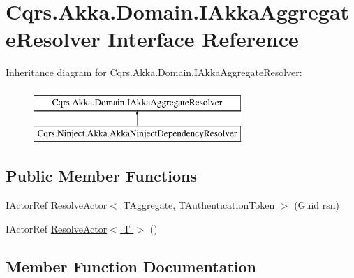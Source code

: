\hypertarget{interfaceCqrs_1_1Akka_1_1Domain_1_1IAkkaAggregateResolver}{}\section{Cqrs.\+Akka.\+Domain.\+I\+Akka\+Aggregate\+Resolver Interface Reference}
\label{interfaceCqrs_1_1Akka_1_1Domain_1_1IAkkaAggregateResolver}
Inheritance diagram for Cqrs.\+Akka.\+Domain.\+I\+Akka\+Aggregate\+Resolver\+:\begin{figure}[H]
\begin{center}
\leavevmode
\includegraphics[height=2.000000cm]{interfaceCqrs_1_1Akka_1_1Domain_1_1IAkkaAggregateResolver}
\end{center}
\end{figure}
\subsection*{Public Member Functions}
\begin{DoxyCompactItemize}
\item 
I\+Actor\+Ref \hyperlink{interfaceCqrs_1_1Akka_1_1Domain_1_1IAkkaAggregateResolver_a59dbc788ce9893d72684ff5c18945c1d}{Resolve\+Actor$<$ T\+Aggregate, T\+Authentication\+Token $>$} (Guid rsn)
\item 
I\+Actor\+Ref \hyperlink{interfaceCqrs_1_1Akka_1_1Domain_1_1IAkkaAggregateResolver_a9c3e3f9e8a963ea0b11e79f9eb1c55a9}{Resolve\+Actor$<$ T $>$} ()
\end{DoxyCompactItemize}


\subsection{Member Function Documentation}
\mbox{\label{interfaceCqrs_1_1Akka_1_1Domain_1_1IAkkaAggregateResolver_a9c3e3f9e8a963ea0b11e79f9eb1c55a9}} 
